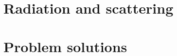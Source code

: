 %
%
      \section{Radiation and scattering}
      \section{Problem solutions}
         \shipoutAnswer
